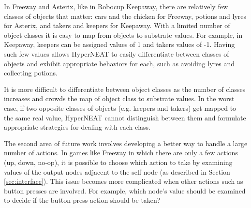 \documentclass{acm_proc_article-sp}
\begin{document}
In Freeway and Asterix, like in Robocup Keepaway, there are relatively few classes of objects that matter: cars and the chicken for Freeway, potions and lyres for Asterix, and takers and keepers for Keepaway. With a limited number of object classes it is easy to map from objects to substrate values. For example, in Keepaway, keepers can be assigned values of 1 and takers values of -1. Having such few values allows HyperNEAT to easily differentiate between classes of objects and exhibit appropriate behaviors for each, such as avoiding lyres and collecting potions.

It is more difficult to differentiate between object classes as the number of classes increases and crowds the map of object class to substrate values. In the worst case, if two opposite classes of objects (e.g. keepers and takers) get mapped to the same real value, HyperNEAT cannot distinguish between them and formulate appropriate strategies for dealing with each class.


The second area of future work involves developing a better way to handle a large number of actions. In games like Freeway in which there are only a few actions (up, down, no-op), it is possible to choose which action to take by examining values of the output nodes adjacent to the self node (as described in Section \ref{sec:interface}). This issue becomes more complicated when other actions such as button presses are involved. For example, which node's value should be examined to decide if the button press action should be taken? 

\end{document}
